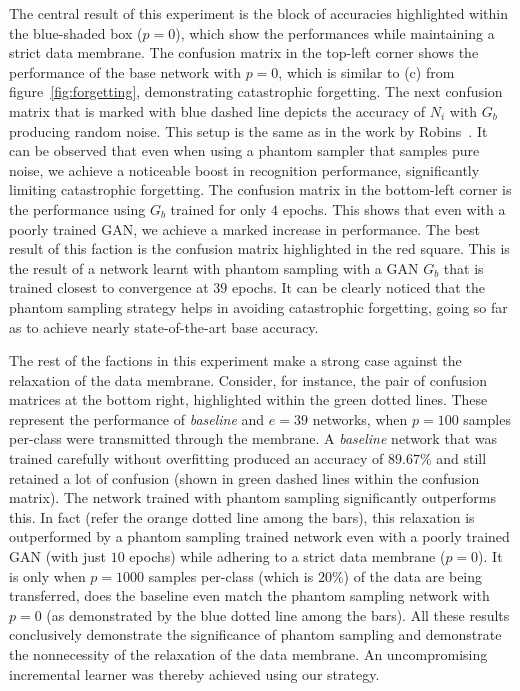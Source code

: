 \documentclass[10pt,twocolumn,letterpaper]{article}
\begin{document}
	The central result of this experiment is the block of accuracies highlighted within the blue-shaded box ($p=0$), which show the performances while maintaining a strict data membrane.
	The confusion matrix in the top-left corner shows the performance of the base network with $p=0$, which is similar to (c) from figure~\ref{fig:forgetting}, demonstrating catastrophic forgetting. 
	The next confusion matrix that is marked with blue dashed line depicts the accuracy of $N_i$ with $G_b$ producing random noise.
	This setup is the same as in the work by Robins~\cite{robins1995catastrophic}.  
	It can be observed that even when using a phantom sampler that samples pure noise, we achieve a noticeable boost in recognition performance, significantly limiting catastrophic forgetting.
	The confusion matrix in the bottom-left corner is the performance using $G_b$ trained for only $4$ epochs.
	This shows that even with a poorly trained GAN, we achieve a marked increase in performance.
	The best result of this faction is the confusion matrix highlighted in the red square.
	This is the result of a network learnt with phantom sampling with a GAN $G_b$ that is trained closest to convergence at $39$ epochs. 
	It can be clearly noticed that the phantom sampling strategy helps in avoiding catastrophic forgetting, going so far as to achieve nearly state-of-the-art base accuracy.   
	
	The rest of the factions in this experiment make a strong case against the relaxation of the data membrane.  
	Consider, for instance, the pair of confusion matrices at the bottom right, highlighted within the green dotted lines.
	These represent the performance of \emph{baseline} and $e=39$ networks, when $p=100$ samples per-class were transmitted through the membrane.
	A \emph{baseline} network that was trained carefully without overfitting produced an accuracy of $89.67\%$ and still retained a lot of confusion (shown in green dashed lines within the confusion matrix). 
	The network trained with phantom sampling significantly outperforms this. 
	In fact (refer the orange dotted line among the bars), this relaxation is outperformed by a phantom sampling trained network even with a poorly trained GAN (with just $10$ epochs) while adhering to a strict data membrane ($p=0$). 
	It is only when $p = 1000$ samples per-class (which is $20\%$) of the data are being transferred, does the baseline even match the phantom sampling network with $p=0$ (as demonstrated by the blue dotted line among the bars). 
	All these results conclusively demonstrate the significance of phantom sampling and demonstrate the nonnecessity of the relaxation of the data membrane. 
	An uncompromising incremental learner was thereby achieved using our strategy.
	
\end{document}
